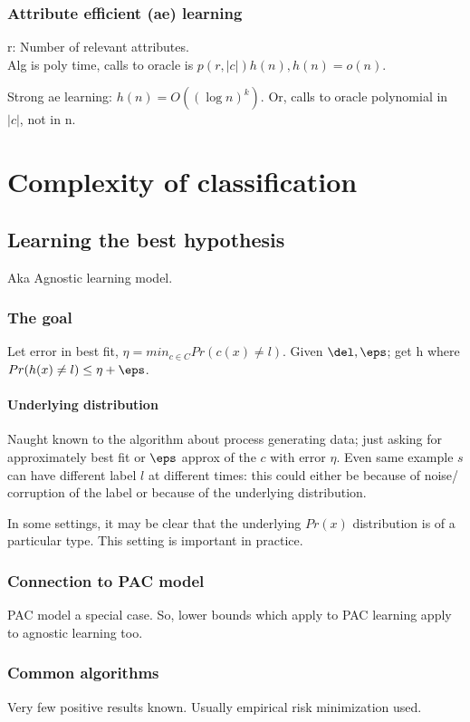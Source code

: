 \documentclass[oneside, article]{memoir}
\begin{document}
\section{Attribute efficient (ae) learning}
r: Number of relevant attributes. \\
Alg is poly time, calls to oracle is $p(r, |c|)h(n), h(n) = o(n)$.

Strong ae learning:
$h(n) = O((\log n)^{k})$. Or, calls to oracle polynomial in $|c|$, not in n.

\part{Complexity of classification}
\chapter{Learning the best hypothesis}
Aka Agnostic learning model.

\section{The goal}
Let error in best fit, $\eta = min_{c \in C} Pr(c(x) \neq l)$. Given $\del, \eps$; get h where $Pr(h(x) \neq l) \leq \eta + \eps$. 

\subsection{Underlying distribution}
Naught known to the algorithm about process generating data; just asking for approximately best fit or $\eps$ approx of the $c$ with error $\eta$. Even same example $s$ can have different label $l$ at different times: this could either be because of noise/ corruption of the label or because of the underlying distribution.

In some settings, it may be clear that the underlying $Pr(x)$ distribution is of a particular type. This setting is important in practice.

\section{Connection to PAC model}
PAC model a special case. So, lower bounds which apply to PAC learning apply to agnostic learning too.

\section{Common algorithms}
Very few positive results known. Usually empirical risk minimization used.
\end{document}
